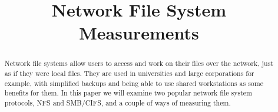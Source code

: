 \documentclass[conference,a4paper]{IEEEtran}
\begin{document}
%
\title{Network File System Measurements}


\author{
}

\maketitle

\begin{abstract}
Network file systems allow users to access and work on their files over the network,
just as if they were local files.
They are used in universities and large corporations for example,
with simplified backups and being able to use shared workstations as some benefits for them.
In this paper we will examine two popular network file system protocols, NFS and SMB/CIFS,
and a couple of ways of measuring them.
\end{abstract}








\end{document}
